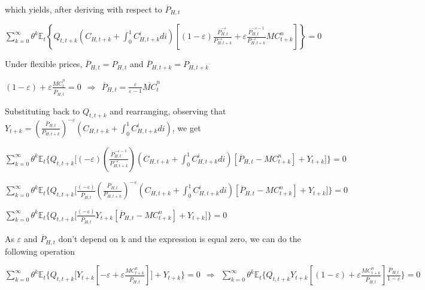 \documentclass[
]{article}
\begin{document}
which yields, after deriving with respect to \(\overline{P}_{H,t}\)

\(\displaystyle \sum_{k=0}^\infty \theta^k\mathbb{E}_t \left\{Q_{t,t+k} \left( C_{H,t+k}+\int_0^1C_{H,t+k}^i di\right) \left[(1-\varepsilon)\frac{\overline{P}_{H,t}^{-\varepsilon}}{P_{H,t+k}^{-\varepsilon}} +\varepsilon \frac{\overline{P}_{H,t}^{-\varepsilon-1}}{P_{H,t+k}^{-\varepsilon}} MC_{t+k}^n \right] \right\}=0\)

Under flexible prices, \(\overline P_{H,t}= P_{H,t}\) and
\(\overline P_{H,t+k}=P_{H, t+k}\)

\(\displaystyle (1-\varepsilon)+\varepsilon\frac{\overline{MC}_{t}^n}{\overline{P}_{H,t}}=0 \ \ \Rightarrow \ \ \overline{P}_{H,t} =\frac{\varepsilon}{\varepsilon-1} \overline{MC}_{t}^n\)

Substituting back to \(Q_{t, t+k}\) and rearranging, observing that
\(\displaystyle Y_{t+k} = \left( \frac{\overline{P}_{H,t}}{P_{H,t+k}} \right)^{-\varepsilon} \left( C_{H,t+k}+\int_0^1C_{H,t+k}^i di\right)\),
we get

\(\displaystyle \sum_{k=0}^\infty \theta^k\mathbb{E}_t \Bigg\{ Q_{t,t+k} \Bigg[ (-\varepsilon) \left( \frac{\overline{P}_{H,t}^{-\varepsilon-1} }{P_{H,t+k}^{-\varepsilon} } \right)\left( C_{H,t+k}+\int_0^1 C_{H,t+k}^idi \right) \left[ \overline{P}_{H,t}-MC_{t+k}^n\right] + Y_{t+k} \Bigg]\Bigg\} = 0\)

\(\displaystyle \sum_{k=0}^\infty \theta^k\mathbb{E}_t \Bigg\{ Q_{t,t+k} \Bigg[ \frac{(-\varepsilon)}{\overline{P}_{H,t}} \left( \frac{\overline{P}_{H,t}}{P_{H,t+k}} \right)^{-\varepsilon} \left( C_{H,t+k}+\int_0^1 C_{H,t+k}^idi \right) \left[ \overline{P}_{H,t}-MC_{t+k}^n\right] + Y_{t+k} \Bigg] \Bigg\} = 0\)

\(\displaystyle \sum_{k=0}^\infty \theta^k\mathbb{E}_t \Bigg\{ Q_{t,t+k} \Bigg[ \frac{(-\varepsilon)}{\overline{P}_{H,t}} Y_{t+k } \left[ \overline{P}_{H,t}-MC_{t+k}^n\right] + Y_{t+k} \Bigg]\Bigg\} = 0\)

As \(\varepsilon\) and \(\overline{P}_{H,t}\) don't depend on k and the
expression is equal zero, we can do the following operation

\(\displaystyle \sum_{k=0}^\infty \theta^k\mathbb{E}_t \Bigg\{ Q_{t,t+k} \Bigg[ Y_{t+k } \left[ -\varepsilon+\varepsilon \frac{MC_{t+k}^n}{\overline{P}_{H,t}} \right] \Bigg] + Y_{t+k} \Bigg\} = 0 \ \ \Rightarrow \ \ \sum_{k=0}^\infty \theta^k\mathbb{E}_t \Bigg\{ Q_{t,t+k} Y_{t+k } \left[ (1-\varepsilon)+\varepsilon \frac{MC_{t+k}^n}{\overline{P}_{H,t}} \right] \frac{\overline{P}_{H,t}}{1-\varepsilon} \Bigg\} = 0\)
\end{document}
